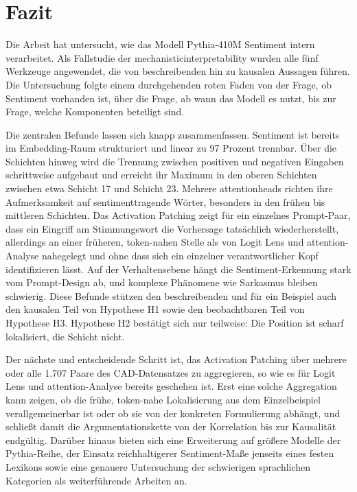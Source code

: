\section{Fazit}

Die Arbeit hat untersucht, wie das Modell Pythia-410M Sentiment intern verarbeitet. Als Fallstudie der \gls{mechanisticinterpretability} wurden alle fünf Werkzeuge angewendet, die von beschreibenden hin zu kausalen Aussagen führen. Die Untersuchung folgte einem durchgehenden roten Faden von der Frage, ob Sentiment vorhanden ist, über die Frage, ab wann das Modell es nutzt, bis zur Frage, welche Komponenten beteiligt sind.

Die zentralen Befunde lassen sich knapp zusammenfassen. Sentiment ist bereits im Embedding-Raum strukturiert und linear zu 97 Prozent trennbar. Über die Schichten hinweg wird die Trennung zwischen positiven und negativen Eingaben schrittweise aufgebaut und erreicht ihr Maximum in den oberen Schichten zwischen etwa Schicht 17 und Schicht 23. Mehrere \glspl{attentionhead} richten ihre Aufmerksamkeit auf sentimenttragende Wörter, besonders in den frühen bis mittleren Schichten. Das Activation Patching zeigt für ein einzelnes Prompt-Paar, dass ein Eingriff am Stimmungswort die Vorhersage tatsächlich wiederherstellt, allerdings an einer früheren, token-nahen Stelle als von Logit Lens und \gls{attention}-Analyse nahegelegt und ohne dass sich ein einzelner verantwortlicher Kopf identifizieren lässt. Auf der Verhaltensebene hängt die Sentiment-Erkennung stark vom Prompt-Design ab, und komplexe Phänomene wie Sarkasmus bleiben schwierig. Diese Befunde stützen den beschreibenden und für ein Beispiel auch den kausalen Teil von Hypothese H1 sowie den beobachtbaren Teil von Hypothese H3. Hypothese H2 bestätigt sich nur teilweise: Die Position ist scharf lokalisiert, die Schicht nicht.

Der nächste und entscheidende Schritt ist, das Activation Patching über mehrere oder alle 1.707 Paare des CAD-Datensatzes zu aggregieren, so wie es für Logit Lens und \gls{attention}-Analyse bereits geschehen ist. Erst eine solche Aggregation kann zeigen, ob die frühe, token-nahe Lokalisierung aus dem Einzelbeispiel verallgemeinerbar ist oder ob sie von der konkreten Formulierung abhängt, und schließt damit die Argumentationskette von der Korrelation bis zur Kausalität endgültig. Darüber hinaus bieten sich eine Erweiterung auf größere Modelle der Pythia-Reihe, der Einsatz reichhaltigerer Sentiment-Maße jenseits eines festen Lexikons sowie eine genauere Untersuchung der schwierigen sprachlichen Kategorien als weiterführende Arbeiten an.

